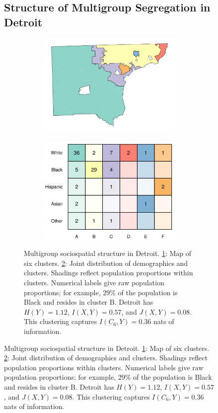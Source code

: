 \documentclass[english]{scrartcl}
\begin{document}
\begin{figure}
	\subsection{Structure of Multigroup Segregation in Detroit}
		\begin{figure}
		\centering
			\begin{subfigure}[b]{0.45\textwidth}
			\includegraphics[width = \textwidth]{figs/example_cluster_map.pdf}
			\caption{} \label{subfig:detroit_map}
			\end{subfigure}
			\begin{subfigure}[b]{0.45\textwidth}
			\includegraphics[width = \textwidth]{figs/example_clusters_detailed.pdf}
			\caption{} \label{subfig:detroit_groups}
			\end{subfigure}
			\caption{Multigroup sociospatial structure in Detroit. \ref{subfig:detroit_map}: Map of six clusters. \ref{subfig:detroit_groups}: Joint distribution of demographics and clusters. Shadings reflect population proportions within clusters. Numerical labels give raw population proportions; for example, 29\% of the population is Black and resides in cluster B. Detroit has $H(Y) = 1.12$, $I(X,Y) = 0.57$, and $J(X,Y) = 0.08$. This clustering captures $I(C_6,Y) = 0.36$ nats of information.} \label{fig:detroit}
		\end{figure}


\end{figure}
\end{document}
